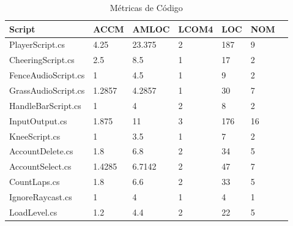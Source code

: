 \begin{table}[htp]
\centering
\caption{Métricas de Código}
\label{figura:metricas}
\begin{tabular}{lllllll}
\hline
Script & ACCM & AMLOC & LCOM4 & LOC & NOM \\
\hline
PlayerScript.cs & 4.25\cellcolor[HTML]{9AFF99} & 23.375\cellcolor[HTML]{FFCE93} & 2\cellcolor[HTML]{FFFC9E} & 187\cellcolor[HTML]{FFCE93} & 9\cellcolor[HTML]{9AFF99} \\
CheeringScript.cs & 2.5\cellcolor[HTML]{9AFF99} & 8.5\cellcolor[HTML]{9AFF99} & 1\cellcolor[HTML]{9AFF99} & 17\cellcolor[HTML]{9AFF99} & 2\cellcolor[HTML]{9AFF99} \\
FenceAudioScript.cs & 1\cellcolor[HTML]{9AFF99} & 4.5\cellcolor[HTML]{9AFF99} & 1\cellcolor[HTML]{9AFF99} & 9\cellcolor[HTML]{9AFF99} & 2\cellcolor[HTML]{9AFF99} \\
GrassAudioScript.cs & 1.2857\cellcolor[HTML]{9AFF99} & 4.2857\cellcolor[HTML]{9AFF99} & 1\cellcolor[HTML]{9AFF99} & 30\cellcolor[HTML]{9AFF99} & 7\cellcolor[HTML]{9AFF99} \\
HandleBarScript.cs & 1\cellcolor[HTML]{9AFF99} & 4\cellcolor[HTML]{9AFF99} & 2\cellcolor[HTML]{FFFC9E} & 8\cellcolor[HTML]{9AFF99} & 2\cellcolor[HTML]{9AFF99} \\
InputOutput.cs & 1.875\cellcolor[HTML]{9AFF99} & 11\cellcolor[HTML]{FFFC9E} & 3\cellcolor[HTML]{FFFC9E} & 176\cellcolor[HTML]{FFCE93} & 16\cellcolor[HTML]{FFFC9E} \\
KneeScript.cs & 1\cellcolor[HTML]{9AFF99} & 3.5\cellcolor[HTML]{9AFF99} & 1\cellcolor[HTML]{9AFF99} & 7\cellcolor[HTML]{9AFF99} & 2\cellcolor[HTML]{9AFF99} \\
AccountDelete.cs & 1.8\cellcolor[HTML]{9AFF99} & 6.8\cellcolor[HTML]{9AFF99} & 2\cellcolor[HTML]{FFFC9E} & 34\cellcolor[HTML]{9AFF99} & 5\cellcolor[HTML]{9AFF99} \\
AccountSelect.cs & 1.4285\cellcolor[HTML]{9AFF99} & 6.7142\cellcolor[HTML]{9AFF99} & 2\cellcolor[HTML]{FFFC9E} & 47\cellcolor[HTML]{9AFF99} & 7\cellcolor[HTML]{9AFF99} \\
CountLaps.cs & 1.8\cellcolor[HTML]{9AFF99} & 6.6\cellcolor[HTML]{9AFF99} & 2\cellcolor[HTML]{FFFC9E} & 33\cellcolor[HTML]{9AFF99} & 5\cellcolor[HTML]{9AFF99} \\
IgnoreRaycast.cs & 1\cellcolor[HTML]{9AFF99} & 4\cellcolor[HTML]{9AFF99} & 1\cellcolor[HTML]{9AFF99} & 4\cellcolor[HTML]{9AFF99} & 1\cellcolor[HTML]{9AFF99} \\
LoadLevel.cs & 1.2\cellcolor[HTML]{9AFF99} & 4.4\cellcolor[HTML]{9AFF99} & 2\cellcolor[HTML]{FFFC9E} & 22\cellcolor[HTML]{9AFF99} & 5\cellcolor[HTML]{9AFF99} \\

\end{tabular}
\end{table}
